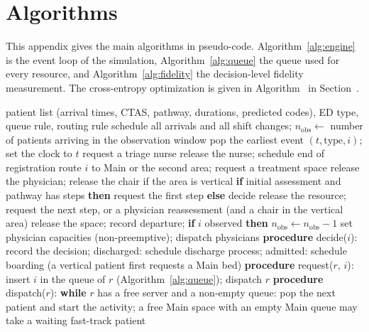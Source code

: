 \section{Algorithms}
\label{app:algorithms}

This appendix gives the main algorithms in pseudo-code. Algorithm~\ref{alg:engine} is the event loop of the simulation, Algorithm~\ref{alg:queue} the queue used for every resource, and Algorithm~\ref{alg:fidelity} the decision-level fidelity measurement. The cross-entropy optimization is given in Algorithm~ in Section~.

\begin{algorithm}[H]
\caption{Event loop of the ED simulation}
\label{alg:engine}
\begin{algorithmic}[1]
\REQUIRE patient list (arrival times, CTAS, pathway, durations, predicted codes), ED type, queue rule, routing rule
\STATE schedule all arrivals and all shift changes; $n_{\text{obs}}\leftarrow$ number of patients arriving in the observation window
\STATE pop the earliest event $(t,\text{type},i)$; set the clock to $t$
 \STATE request a triage nurse
 \STATE release the nurse; schedule end of registration
 \STATE route $i$ to Main or the second area; request a treatment space
 \STATE release the physician; release the chair if the area is vertical
\STATE \textbf{if} initial assessment and pathway has steps \textbf{then} request the first step \textbf{else} decide
 \STATE release the resource; request the next step, or a physician reassessment (and a chair in the vertical area)
 \STATE release the space; record departure; \textbf{if} $i$ observed \textbf{then} $n_{\text{obs}}\leftarrow n_{\text{obs}}-1$
 \STATE set physician capacities (non-preemptive); dispatch physicians
\ENDIF
\ENDWHILE
\STATE \textbf{procedure} decide($i$): record the decision; discharged: schedule discharge process; admitted: schedule boarding (a vertical patient first requests a Main bed)
\STATE \textbf{procedure} request($r$, $i$): insert $i$ in the queue of $r$ (Algorithm~\ref{alg:queue}); dispatch $r$
\STATE \textbf{procedure} dispatch($r$): \textbf{while} $r$ has a free server and a non-empty queue: pop the next patient and start the activity; a free Main space with an empty Main queue may take a waiting fast-track patient
\end{algorithmic}
\end{algorithm}

